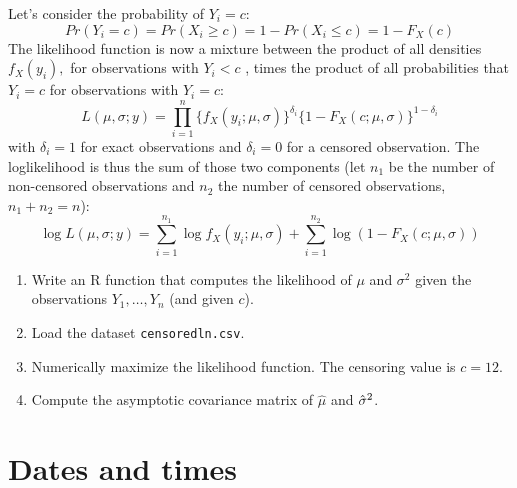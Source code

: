 \documentclass{article}
\begin{document}
\begin{enumerate}
Let's consider the probability of $Y_i=c$:
\begin{equation*}
Pr(Y_i = c) = Pr(X_i \geq c) = 1 - Pr(X_i \leq c) = 1- F_X(c)
\end{equation*}
The likelihood function is now a mixture between the product of all densities $f_{X}(y_{i}),$ for observations with $Y_{i}<c$%
, times the product of all probabilities that $Y_{i}=c$ for observations with
$Y_{i}=c$:
\begin{equation*}
L(\mu,\sigma; y) = \prod_{i=1}^n\{ f_X(y_i;\mu,\sigma)\}^{\delta_i}\{1-F_X(c;\mu,\sigma)\}^{1-\delta_i}
\end{equation*}
with $\delta_i=1$ for exact observations and $\delta_i=0$ for a censored
observation. The loglikelihood is thus the sum of those two components (let
$n_1$ be the number of non-censored observations and $n_2$ the number of
censored observations, $n_1+n_2=n$):
\begin{equation*}
\log L(\mu,\sigma; y) = \sum_{i=1}^{n_1} \log f_X(y_i;\mu,\sigma) +
\sum_{i=1}^{n_2} \log(1-F_X(c;\mu,\sigma))
\end{equation*}


\begin{enumerate}
	\item Write an R function that computes the likelihood of $\mu $ and $\sigma
	^{2}$ given the observations $Y_{1},\ldots ,Y_{n}$ (and given $c$).
	
	\item Load the dataset \texttt{censoredln.csv}.
	
	\item Numerically maximize the likelihood function. The censoring value is $%
	c=12.$
	
	\item Compute the asymptotic covariance matrix of $\hat{\mu}$ and $\hat{%
		\sigma}^{2}$.
\end{enumerate}
\end{enumerate}
\newpage

\section{Dates and times}
\end{document}
